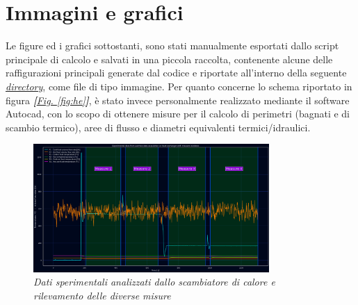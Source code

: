 \documentclass[a4paper,10pt]{article}                                                                                       %
\begin{document}
\section{Immagini e grafici}                                                                                                %
  Le figure ed i grafici sottostanti, sono stati manualmente esportati dallo script principale di calcolo e salvati in una
  piccola raccolta, contenente alcune delle raffigurazioni principali generate dal codice e riportate all'interno della
  seguente \textit{\href{https://github.com/CristianMerli/DataAnalysis/tree/master/final_doc/code_exports/imgs}{directory}},
  come file di tipo immagine. Per quanto concerne lo schema riportato in figura
  \textit{\textbf{[}\hyperref[fig:he]{Fig. }\ref{fig:he}\textbf{]}}, è stato invece personalmente realizzato mediante il
  software Autocad, con lo scopo di ottenere misure per il calcolo di perimetri (bagnati e di scambio termico), aree di
  flusso e diametri equivalenti termici/idraulici.
\label{sec:imgs_graphs}                                                                                                     %
\begin{figure}[H]                                                                                                           %
  \caption{\textit{Dati sperimentali analizzati dallo scambiatore di calore e rilevamento delle diverse misure}}            %
  \label{fig:measures}                                                                                                      %
  \vspace{3mm}                                                                                                              %
  \centering                                                                                                                %
  \includegraphics[width=0.8\textwidth]{../final_doc/code_exports/imgs/measures.png}                                        %
\end{figure}                                                                                                                %
\end{document}
